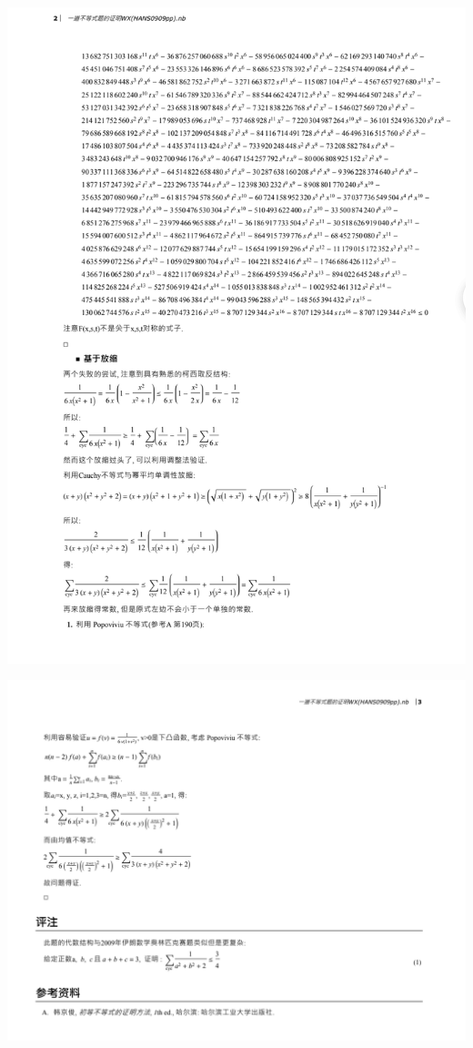 \documentclass[UTF8]{ctexart}
\begin{document}
\begin{center}
	\includegraphics[width=1\linewidth]{a28}
\end{center}
\begin{center}
	\includegraphics[width=1\linewidth]{a29}
\end{center}
\end{document}
